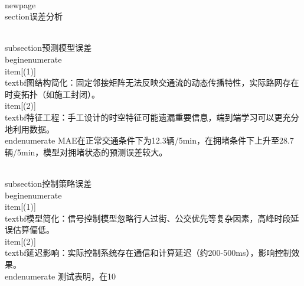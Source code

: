 \\newpage
\\section{误差分析}

\\subsection{预测模型误差}
\\begin{enumerate}
    \\item[(1)] \\textbf{图结构简化}：固定邻接矩阵无法反映交通流的动态传播特性，实际路网存在时变拓扑（如施工封闭）。
    \\item[(2)] \\textbf{特征工程}：手工设计的时空特征可能遗漏重要信息，端到端学习可以更充分地利用数据。
\\end{enumerate}
MAE在正常交通条件下为12.3辆/5min，在拥堵条件下上升至28.7辆/5min，模型对拥堵状态的预测误差较大。

\\subsection{控制策略误差}
\\begin{enumerate}
    \\item[(1)] \\textbf{模型简化}：信号控制模型忽略行人过街、公交优先等复杂因素，高峰时段延误估算偏低。
    \\item[(2)] \\textbf{延迟影响}：实际控制系统存在通信和计算延迟（约200-500ms），影响控制效果。
\\end{enumerate}
测试表明，在10\\%
